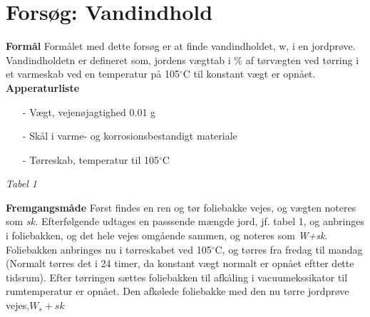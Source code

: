 \chapter{Forsøg: Vandindhold}

\textbf{Formål}
\newline
Formålet med dette forsøg er at finde vandindholdet, w, i en jordprøve. Vandindholdetn er defineret som, jordens vægttab i \% af tørvægten ved tørring i et varmeskab ved en temperatur på 105$^{\circ}$C til konstant vægt er opnået.
\newline
\newline
\textbf{Apperaturliste}
\begin{itemize}
\item[-] Vægt, vejenøjagtighed 0.01 g
\item[-] Skål i varme- og korrosionsbestandigt materiale
\item[-] Tørreskab, temperatur til 105$^{\circ}$C
\end{itemize}

\textit{Tabel 1}


\textbf{Fremgangsmåde}
\newline
Først findes en ren og tør foliebakke vejes, og vægten noteres som \textit{sk.} Efterfølgende udtages en passsende mængde jord, jf. tabel 1, og anbringes i foliebakken, og det hele vejes omgående sammen, og noteres som \textit{W+sk}.
\newline
Foliebakken anbringes nu i tørreskabet ved 105$^{\circ}$C, og tørres fra fredag til mandag (Normalt tørres det i 24 timer, da konstant vægt normalt er opnået eftter dette tidsrum). Efter tørringen sættes foliebakken til afkåling i vacuumekssikator til rumtemperatur er opnået. Den afkølede foliebakke med den nu tørre jordprøve vejes,\textit{$W_{s}+sk$}



